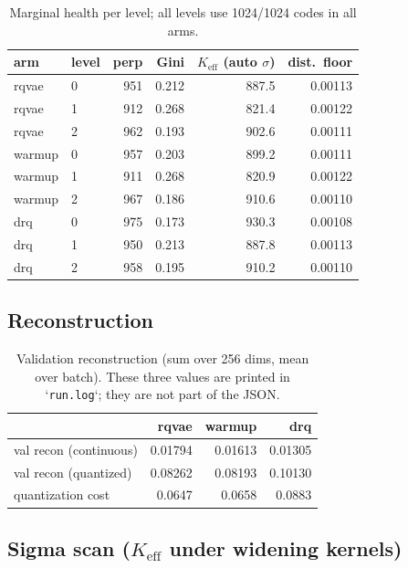 \documentclass[11pt]{article}
\newcommand{\Keff}{K_{\mathrm{eff}}}
\begin{document}
\begin{table}[h]
\centering
\begin{tabular}{llrrrr}
\toprule
arm & level & perp & Gini & $\Keff$ (auto $\sigma$) & dist.\ floor \\
\midrule
rqvae  & 0 & 951 & 0.212 & 887.5 & 0.00113 \\
rqvae  & 1 & 912 & 0.268 & 821.4 & 0.00122 \\
rqvae  & 2 & 962 & 0.193 & 902.6 & 0.00111 \\
\midrule
warmup & 0 & 957 & 0.203 & 899.2 & 0.00111 \\
warmup & 1 & 911 & 0.268 & 820.9 & 0.00122 \\
warmup & 2 & 967 & 0.186 & 910.6 & 0.00110 \\
\midrule
drq    & 0 & 975 & 0.173 & 930.3 & 0.00108 \\
drq    & 1 & 950 & 0.213 & 887.8 & 0.00113 \\
drq    & 2 & 958 & 0.195 & 910.2 & 0.00110 \\
\bottomrule
\end{tabular}
\caption{Marginal health per level; all levels use 1024/1024 codes in all arms.}
\end{table}

\subsection{Reconstruction}

\begin{table}[h]
\centering
\begin{tabular}{lrrr}
\toprule
& rqvae & warmup & drq \\
\midrule
val recon (continuous) & 0.01794 & 0.01613 & 0.01305 \\
val recon (quantized)  & 0.08262 & 0.08193 & 0.10130 \\
quantization cost      & 0.0647  & 0.0658  & 0.0883 \\
\bottomrule
\end{tabular}
\caption{Validation reconstruction (sum over 256 dims, mean over batch). These
three values are printed in `\texttt{run.log}`; they are not part of the JSON.}
\end{table}

\subsection{Sigma scan ($\Keff$ under widening kernels)}
\end{document}
